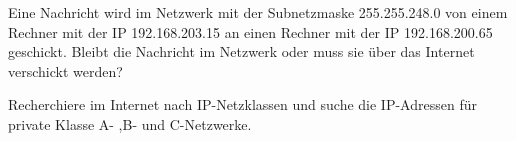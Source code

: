 \documentclass[10pt, a4paper]{scrartcl}
\begin{document}
\begin{aufgabe}
	Eine Nachricht wird im Netzwerk mit der Subnetzmaske 255.255.248.0 von einem Rechner mit der IP 192.168.203.15 an einen Rechner mit der IP 192.168.200.65 geschickt. Bleibt die Nachricht im Netzwerk oder muss sie über das Internet verschickt werden?
\end{aufgabe}

\begin{aufgabe}
	Recherchiere im Internet nach IP-Netzklassen und suche die IP-Adressen für private Klasse A- ,B- und C-Netzwerke.
\end{aufgabe}
\end{document}
